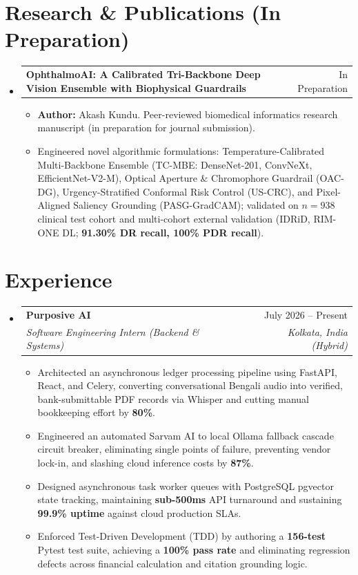 \documentclass[letterpaper,10pt]{article}
\makeatletter
\newcommand{\resumeItem}[1]{
  \item\small{
    {#1 \vspace{-2pt}}
  }
}
\newcommand{\resumeSubheading}[4]{
  \vspace{-1pt}\item
    \begin{tabular*}{0.97\textwidth}[t]{l@{\extracolsep{\fill}}r}
      \textbf{#1} & #2 \\
      \textit{\small#3} & \textit{\small #4} \\
    \end{tabular*}\vspace{-5pt}
}
\newcommand{\resumeProjectHeading}[2]{
    \vspace{-1pt}\item
    \begin{tabular*}{0.97\textwidth}{l@{\extracolsep{\fill}}r}
      \small#1 & #2 \\
    \end{tabular*}\vspace{-5pt}
}
\newcommand{\resumeSubHeadingListStart}{\begin{itemize}[leftmargin=0.15in, label={}]}
\newcommand{\resumeSubHeadingListEnd}{\end{itemize}}
\newcommand{\resumeItemListStart}{\begin{itemize}[leftmargin=0.15in]}
\newcommand{\resumeItemListEnd}{\end{itemize}\vspace{-4pt}}
\makeatother
\begin{document}
\section{Research \& Publications (In Preparation)}
  \resumeSubHeadingListStart
    \resumeProjectHeading
      {\textbf{OphthalmoAI: A Calibrated Tri-Backbone Deep Vision Ensemble with Biophysical Guardrails}}{In Preparation}
      \resumeItemListStart
        \resumeItem{\textbf{Author:} Akash Kundu. Peer-reviewed biomedical informatics research manuscript (in preparation for journal submission).}
        \resumeItem{Engineered novel algorithmic formulations: Temperature-Calibrated Multi-Backbone Ensemble (TC-MBE: DenseNet-201, ConvNeXt, EfficientNet-V2-M), Optical Aperture \& Chromophore Guardrail (OAC-DG), Urgency-Stratified Conformal Risk Control (US-CRC), and Pixel-Aligned Saliency Grounding (PASG-GradCAM); validated on $n=938$ clinical test cohort and multi-cohort external validation (IDRiD, RIM-ONE DL; \textbf{91.30\% DR recall, 100\% PDR recall}).}
      \resumeItemListEnd
  \resumeSubHeadingListEnd

\section{Experience}
  \resumeSubHeadingListStart
    \resumeSubheading
      {Purposive AI}{July 2026 -- Present}
      {Software Engineering Intern (Backend \& Systems)}{Kolkata, India (Hybrid)}
      \resumeItemListStart
        \resumeItem{Architected an asynchronous ledger processing pipeline using FastAPI, React, and Celery, converting conversational Bengali audio into verified, bank-submittable PDF records via Whisper and cutting manual bookkeeping effort by \textbf{80\%}.}
        \resumeItem{Engineered an automated Sarvam AI to local Ollama fallback cascade circuit breaker, eliminating single points of failure, preventing vendor lock-in, and slashing cloud inference costs by \textbf{87\%}.}
        \resumeItem{Designed asynchronous task worker queues with PostgreSQL pgvector state tracking, maintaining \textbf{sub-500ms} API turnaround and sustaining \textbf{99.9\% uptime} against cloud production SLAs.}
        \resumeItem{Enforced Test-Driven Development (TDD) by authoring a \textbf{156-test} Pytest test suite, achieving a \textbf{100\% pass rate} and eliminating regression defects across financial calculation and citation grounding logic.}
      \resumeItemListEnd
  \resumeSubHeadingListEnd
\end{document}
